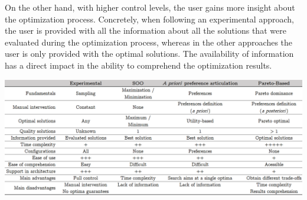 	On the other hand, with higher control levels, the user gains more insight about the optimization process. Concretely, when following an experimental approach, the user is provided with all the information about all the solutions that were evaluated during the optimization process, whereas in the other approaches the user is only provided with the optimal solutions. The availability of information has a direct impact in the ability to comprehend the optimization results.
	\begin{table}[]
		\centering
		\label{table:optimization-approaches}
		\caption{Comparison between different optimization approaches.}
		\includegraphics[width=1\textwidth]{tables_and_code/approaches_comparison.PNG}

\end{table}
